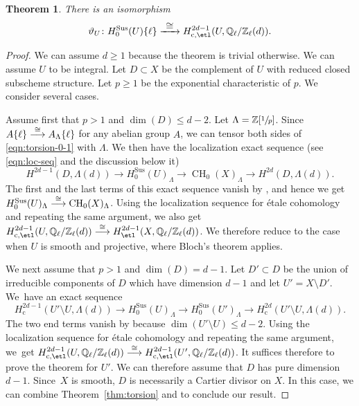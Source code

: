 \documentclass[JEP,XML,SOM,Unicode,published]{cedram}
\def\To#1{\mathchoice{\xrightarrow{\textstyle\kern4pt#1\kern3pt}}{\stackrel{#1}{\longrightarrow}}{}{}}
\newcommand{\rc}{\mathrm{c}}
\newcommand{\sus}{\mathrm{Sus}}
\newtheorem{thm}{Theorem}[section]
\theoremstyle{definition}
\newcommand{\thmref}{Theorem~\ref}
\newcommand{\Q}{{\mathbb Q}}
\newcommand{\Z}{{\mathbb Z}}
\DeclareMathOperator{\CH}{CH}
\begin{document}
\begin{thm}\label{thm:torsion-0}
There is an isomorphism
\begin{equation}\label{eqn:torsion-0-1}
\vartheta_U \colon
H^{\sus}_0(U)\{\ell\} \To{\cong} H^{2d-1}_{\rc, \etl}(U, {\Q_\ell}/{\Z_\ell}(d)).
\end{equation}
\end{thm}
\begin{proof}
We can assume $d \ge 1$ because the theorem is trivial otherwise.
We can assume $U$ to be integral.
Let $D \subset X$ be the complement of $U$ with reduced closed subscheme structure.
Let $p \ge 1$ be the exponential characteristic of $p$.
We consider several cases.

Assume first that $p > 1$ and $\dim(D) \le d-2$.
Let $\Lambda = \Z[\sfrac{1}{p}]$.
Since $A\{\ell\} \To{\cong} A_\Lambda\{\ell\}$ for any abelian
group $A$,
we can tensor both sides of \eqref{eqn:torsion-0-1} with $\Lambda$.
We then have the localization exact sequence (see \eqref{eqn:loc-seq} and
the discussion below it)
\[
H^{2d-1}(D, \Lambda(d)) \to H^{\sus}_0(U)_\Lambda \to \CH_0(X)_\Lambda \to
H^{2d}(D, \Lambda(d)).
\]
The first and the last terms of this exact sequence vanish by \cite[Th.\,5.1]{KP},
and hence we get $H^{\sus}_0(U)_\Lambda \To{\cong} \CH_0(X)_\Lambda$.
Using the localization sequence for étale cohomology and repeating
the same argument, we also get
$H^{2d-1}_{\rc, \etl}(U, {\Q_\ell}/{\Z_\ell}(d)) \To{\cong}
H^{2d-1}_{\etl}(X, {\Q_\ell}/{\Z_\ell}(d))$. We therefore reduce to the case
when $U$ is smooth and projective, where Bloch's theorem applies.

We next assume that $p > 1$ and $\dim(D) = d-1$.
Let $D' \subset D$ be the union of irreducible components of $D$ which have
dimension $d-1$ and let $U' = X \setminus D'$.
We~have an exact sequence
\[
H^{2d-1}_\rc(U' \setminus U, \Lambda(d)) \to H^{\sus}_0(U)_\Lambda \to
H^{\sus}_0(U')_\Lambda \to H^{2d}_\rc(U' \setminus U, \Lambda(d)).
\]
The two end terms vanish by \cite[Lem.\,6.2]{KP-1} because $\dim(U' \setminus U)
\le d-2$. Using the localization sequence for étale cohomology and repeating
the same argument, we~get
$H^{2d-1}_{\rc, \etl}(U, {\Q_\ell}/{\Z_\ell}(d)) \To{\cong}
H^{2d-1}_{\rc, \etl}(U', {\Q_\ell}/{\Z_\ell}(d))$. It suffices therefore to prove the
theorem for $U'$. We can therefore assume that $D$ has pure dimension $d-1$.
Since~$X$ is smooth, $D$ is necessarily a Cartier divisor on $X$.
In this case, we can combine \thmref{thm:torsion} and
\cite[Th.\,1.1]{Krishna-2} to conclude our result.


\end{proof}
\end{document}
